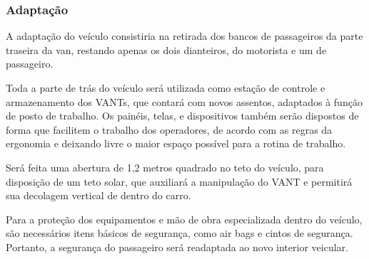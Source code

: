 \subsubsection{Adaptação}
A adaptação do veículo consistiria na retirada dos bancos de passageiros da parte traseira da van, restando apenas os dois dianteiros, do motorista e 	um de passageiro.

Toda a parte de trás do veículo será utilizada como estação de controle e armazenamento dos VANTs, que contará com novos assentos, adaptados à função de posto de trabalho. Os painéis, telas, e dispositivos também serão dispostos de forma que facilitem  o trabalho dos operadores, de acordo com as regras da ergonomia e deixando livre o maior espaço possível para  a  rotina de trabalho.

Será feita uma abertura de 1,2 metros quadrado no teto do veículo, para disposição de um teto solar, que auxiliará a manipulação do VANT e permitirá sua decolagem vertical de dentro do carro.

Para a proteção dos equipamentos e mão de obra especializada dentro do veículo, são necessários itens básicos de segurança, como air bags e cintos de segurança. Portanto, a segurança do passageiro será readaptada ao novo interior veicular.
